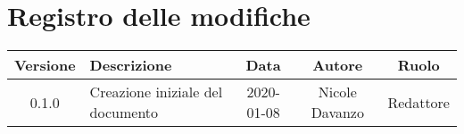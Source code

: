 \section*{Registro delle modifiche}

\begin{center}
	\begin{longtable}{|c|p{5cm}|c|c|c|}
	\hline
	\rowcolor{lighter-grayer}
	\textbf{Versione} & \textbf{Descrizione} & \textbf{Data} & \textbf{Autore} & \textbf{Ruolo} \\
	\hline
	\endfirsthead


	\hline
	0.1.0 & Creazione iniziale del documento & 2020-01-08 & Nicole Davanzo & Redattore \\

	\hline

	\end{longtable}
\end{center}